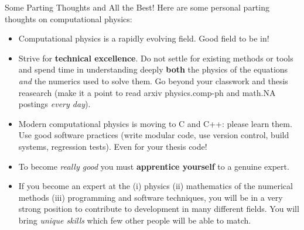 \documentclass[aspectratio=169]{beamer}
\begin{document}
\begin{frame}{Some Parting Thoughts and All the Best!}
  \small
  Here are some personal parting thoughts on computational physics:
  \begin{itemize}
  \item Computational physics is a rapidly evolving field. Good field
    to be in!
  \item Strive for {\bf technical excellence}. Do not settle for
    existing methods or tools and spend time in understanding deeply
    {\bf both} the physics of the equations \emph{and} the numerics
    used to solve them. Go beyond your classwork and thesis reasearch
    (make it a point to read arxiv physics.comp-ph and math.NA
    postings \emph{every day}).
  \item Modern computational physics is moving to C and C++: please
    learn them. Use good software practices (write modular code, use
    version control, build systems, regression tests). Even for your
    thesis code!
  \item To become \emph{really good} you must {\bf apprentice
      yourself} to a genuine expert.
  \item If you become an expert at the (i) physics (ii) mathematics of
    the numerical methods (iii) programming and software techniques,
    you will be in a very strong position to contribute to development
    in many different fields. You will bring \emph{unique skills}
    which few other people will be able to match.
  \end{itemize}
\end{frame}
\end{document}
